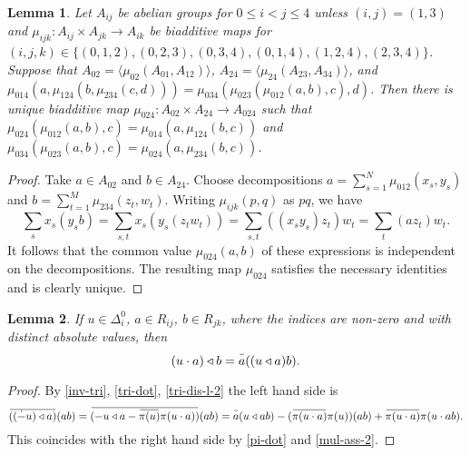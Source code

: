 \documentclass{article}
\newtheorem{lemma}{Lemma}
\theoremstyle{definition}
\newcommand{\dotminus}{\mathbin{\dot{-}}}
\newcommand{\inv}[1]{
    \!\;\overline{
        \!\!\:#1\vphantom !\!\!\:
    }\;\!
}
\begin{document}
\begin{lemma} \label{mul-cons}
    Let \(A_{ij}\) be abelian groups for \(
        0 \leq i < j \leq 4
    \) unless \((i, j) = (1, 3)\) and \(
        \mu_{ijk}
        \colon A_{ij} \times A_{jk}
        \to A_{ik}
    \) be biadditive maps for \(
        (i, j, k) \in \{
            (0, 1, 2),
            (0, 2, 3),
            (0, 3, 4),
            (0, 1, 4),
            (1, 2, 4),
            (2, 3, 4)
        \}
    \). Suppose that \(
        A_{02} = \langle
            \mu_{02}(A_{01}, A_{12})
        \rangle
    \), \(
        A_{24} = \langle
            \mu_{24}(A_{23}, A_{34})
        \rangle
    \), and \(
        \mu_{014}(a, \mu_{124}(b, \mu_{234}(c, d)))
        =
        \mu_{034}(\mu_{023}(\mu_{012}(a, b), c), d)
    \). Then there is unique biadditive map \(
        \mu_{024}
        \colon A_{02} \times A_{24}
        \to A_{024}
    \) such that \(
        \mu_{024}(\mu_{012}(a, b), c)
        =
        \mu_{014}(a, \mu_{124}(b, c))
    \) and \(
        \mu_{034}(\mu_{023}(a, b), c)
        =
        \mu_{024}(a, \mu_{234}(b, c))
    \).
\end{lemma}
\begin{proof}
    Take \(a \in A_{02}\) and \(b \in A_{24}\). Choose decompositions \(
        a = \sum_{s = 1}^N \mu_{012}(x_s, y_s)
    \) and \(
        b = \sum_{t = 1}^M \mu_{234}(z_t, w_t)
    \). Writing \(\mu_{ijk}(p, q)\) as \(pq\), we have \[
        \sum_s x_s (y_s b)
        =
        \sum_{s, t} x_s (y_s (z_t w_t))
        =
        \sum_{s, t} ((x_s y_s) z_t) w_t
        =
        \sum_t (a z_t) w_t.
    \] It follows that the common value \(\mu_{024}(a, b)\) of these expressions is independent on the decompositions. The resulting map \(\mu_{024}\) satisfies the necessary identities and is clearly unique.
\end{proof}

\begin{lemma} \label{tri-dot-2}
    If \(u \in \Delta^0_i\), \(a \in R_{ij}\), \(b \in R_{jk}\), where the indices are non-zero and with distinct absolute values, then \[
        (u \cdot a) \triangleleft b
        =
        \inv a ((u \triangleleft a) b).
    \]
\end{lemma}
\begin{proof}
    By \ref{inv-tri}, \ref{tri-dot}, \ref{tri-dis-l-2} the left hand side is \[
        \inv{ ((\dotminus u) \triangleleft a) } (ab)
        =
        \inv{ (
            - u \triangleleft a
            - \inv{\pi(u)} \pi(u \cdot a)
        ) } (ab)
        =
        \inv a (u \triangleleft ab)
        - (\inv{ \pi(u \cdot a) } \pi(u)) (ab)
        + \inv{ \pi(u \cdot a) } \pi(u \cdot ab).
    \]
    This coincides with the right hand side by \ref{pi-dot} and \ref{mul-ass-2}.
\end{proof}
\end{document}
